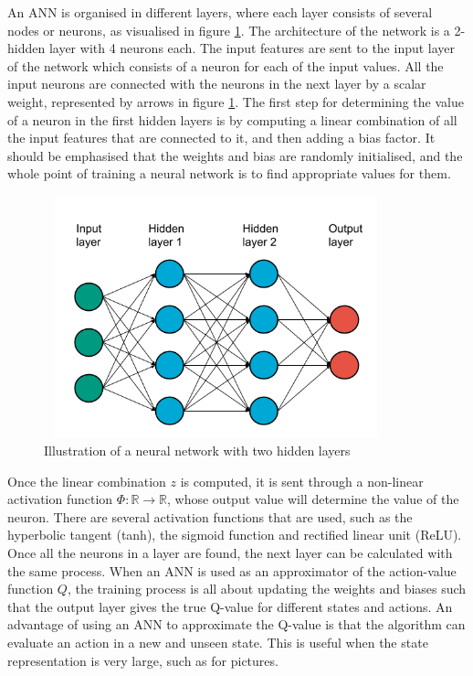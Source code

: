 \documentclass[class=book, crop=false, 11pt]{standalone}
\begin{document}
An ANN is organised in different layers, where each layer consists of several nodes or neurons, as visualised in figure \ref{fig:theory:neural_network}. The architecture of the network is a 2-hidden layer with 4 neurons each. The input features are sent to the input layer of the network which consists of a neuron for each of the input values. All the input neurons are connected with the neurons in the next layer by a scalar weight, represented by arrows in figure \ref{fig:theory:neural_network}. The first step for determining the value of a neuron in the first hidden layers is by computing a linear combination of all the input features that are connected to it, and then adding a bias factor. It should be emphasised that the weights and bias are randomly initialised, and the whole point of training a neural network is to find appropriate values for them.
\begin{figure}[ht!]
    \center
    \includegraphics[height=7cm, width=10cm]{figures/neural_network.png}
    \caption  {Illustration of a neural network with two hidden layers}
    \label{fig:theory:neural_network}
\end{figure}
Once the linear combination $z$ is computed, it is sent through a non-linear activation function $\Phi: \mathbb{R} \to \mathbb{R}$, whose output value will determine the value of the neuron. There are several activation functions that are used, such as the hyperbolic tangent (tanh), the sigmoid function and rectified linear unit (ReLU).  Once all the neurons in a layer are found, the next layer can be calculated with the same process. When an ANN is used as an approximator of the action-value function $Q$, the training process is all about updating the weights and biases such that the output layer gives the true Q-value for different states and actions. An advantage of using an ANN to approximate the Q-value is that the algorithm can evaluate an action in a new and unseen state. This is useful when the state representation is very large, such as for pictures. 
\end{document}
